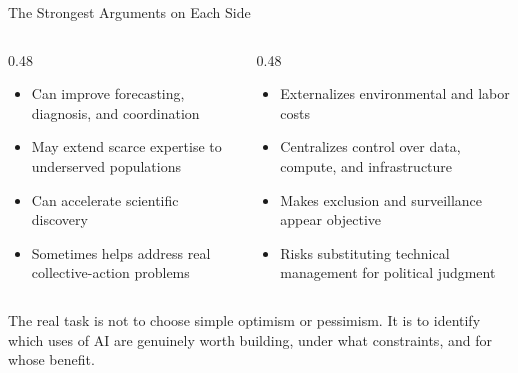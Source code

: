 \documentclass[aspectratio=169,11pt]{beamer}
\begin{document}
\begin{frame}{The Strongest Arguments on Each Side}
\begin{columns}[T]
\begin{column}{0.48\textwidth}
\begin{probox}
\scriptsize
\begin{itemize}
    \item Can improve forecasting, diagnosis, and coordination
    \item May extend scarce expertise to underserved populations
    \item Can accelerate scientific discovery
    \item Sometimes helps address real collective-action problems
\end{itemize}
\end{probox}
\end{column}
\begin{column}{0.48\textwidth}
\begin{objectionbox}
\scriptsize
\begin{itemize}
    \item Externalizes environmental and labor costs
    \item Centralizes control over data, compute, and infrastructure
    \item Makes exclusion and surveillance appear objective
    \item Risks substituting technical management for political judgment
\end{itemize}
\end{objectionbox}
\end{column}
\end{columns}

\vspace{0.2cm}
The real task is not to choose simple optimism or pessimism. It is to identify which uses of AI are genuinely worth building, under what constraints, and for whose benefit.
\end{frame}
\end{document}
